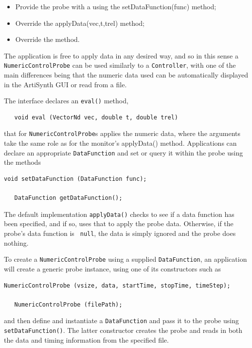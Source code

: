 \begin{itemize}

\item Provide the probe with a 
 using the
%
{setDataFunction(func)} method;

\item Override the %
{applyData(vec,t,trel)}
method;

\item Override the 
method.

\end{itemize}

The application is free to apply data in any desired way, and so in
this sense a {\tt NumericControlProbe} can be used similarly to a
{\tt Controller}, with one of the main differences being that the
numeric data used can be automatically displayed in the ArtiSynth GUI
or read from a file.

The  interface
declares an {\tt eval()} method,
%
\begin{verbatim}
   void eval (VectorNd vec, double t, double trel)
\end{verbatim}
%
that for 
{\tt NumericControlProbe}s applies the numeric data, 
where the arguments take the same role as for the monitor's %
{applyData()}
method. Applications can declare an appropriate {\tt DataFunction} and
set or query it within the probe using the methods
\begin{lstlisting}[]
   void setDataFunction (DataFunction func);

   DataFunction getDataFunction();
\end{lstlisting}
%
The default implementation {\tt applyData()} checks to see
if a data function has been specified, and if so, uses that to
apply the probe data. Otherwise, if the probe's data function is {\tt
null}, the data is simply ignored and the probe does nothing.

To create a {\tt NumericControlProbe} using a supplied {\tt DataFunction},
an application will create a generic probe instance, using one
of its constructors such as 
\begin{lstlisting}[]
   NumericControlProbe (vsize, data, startTime, stopTime, timeStep);

   NumericControlProbe (filePath);
\end{lstlisting}
%
and then define and instantiate a {\tt DataFunction} and pass it to
the probe using {\tt setDataFunction()}. The latter constructor
creates the probe and reads in both the data and timing information
from the specified file.

